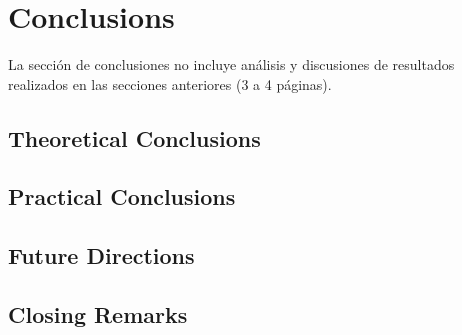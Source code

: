 \chapter{Conclusions}
\label{ch:conclu} %


 La sección de conclusiones no incluye análisis y discusiones de resultados realizados en las secciones anteriores (3 a 4 páginas). 



\section{Theoretical Conclusions}



\section{Practical Conclusions}



\section{Future Directions}



\section{Closing Remarks}

